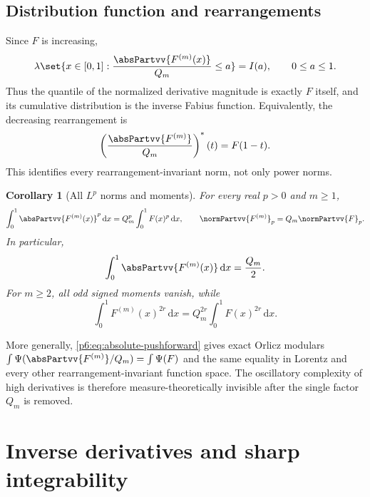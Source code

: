 \documentclass[11pt,oneside]{article}
\newtheorem{corollary}[theorem]{Corollary}
\theoremstyle{definition}
\theoremstyle{remark}
\newcommand{\dd}{\,\mathrm d}
\newcommand{\1}{\mathbf 1}
\begin{document}
\subsection{Distribution function and rearrangements}

Since \(F\) is increasing,
\begin{equation}
 \lambda\set{x\in[0,1]:\frac{\absPartvv{F^{(m)}(x)}}{Q_m}\le a}
 =I(a),\qquad 0\le a\le1.                                \label{p6:eq:derivative-cdf}
\end{equation}
Thus the quantile of the normalized derivative magnitude is exactly \(F\) itself, and
its cumulative distribution is the inverse Fabius function.  Equivalently, the decreasing
rearrangement is
\begin{equation}
 \left(\frac{\absPartvv{F^{(m)}}}{Q_m}\right)^*(t)=F(1-t).     \label{p6:eq:decreasing-rearrangement}
\end{equation}
This identifies every rearrangement-invariant norm, not only power norms.

\begin{corollary}[All \(L^p\) norms and moments]
\label{p6:cor:Lp-derivatives}
For every real \(p>0\) and \(m\ge1\),
\begin{equation}
 \int_0^1\absPartvv{F^{(m)}(x)}^p\dd x
 =Q_m^p\int_0^1F(x)^p\dd x,\qquad
 \normPartvv{F^{(m)}}_p=Q_m\normPartvv{F}_p.                           \label{p6:eq:Lp-derivatives}
\end{equation}
In particular,
\begin{equation}
 \int_0^1\absPartvv{F^{(m)}(x)}\dd x=\frac{Q_m}{2}.            \label{p6:eq:total-variation-derivatives}
\end{equation}
For \(m\ge2\), all odd signed moments vanish, while
\begin{equation}
 \int_0^1F^{(m)}(x)^{2r}\dd x
 =Q_m^{2r}\int_0^1F(x)^{2r}\dd x.                        \label{p6:eq:even-derivative-moments}
\end{equation}
\end{corollary}

More generally, \eqref{p6:eq:absolute-pushforward} gives exact Orlicz modulars
\(
 \int\Psi(\absPartvv{F^{(m)}}/Q_m)=\int\Psi(F)
\)
and the same equality in Lorentz and every other rearrangement-invariant function space.
The oscillatory complexity of high derivatives is therefore measure-theoretically
invisible after the single factor \(Q_m\) is removed.

\section{Inverse derivatives and sharp integrability}
\end{document}
